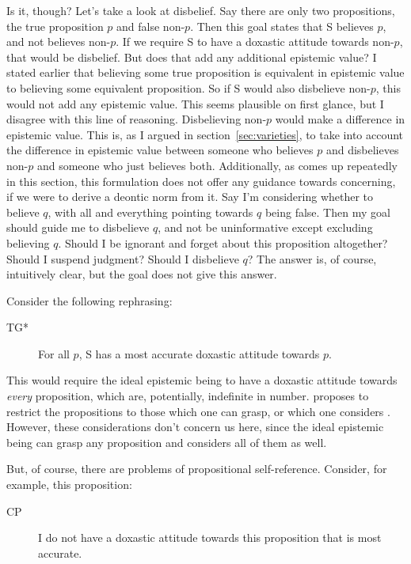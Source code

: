 \documentclass[12pt,numbers=noenddot]{scrartcl}
\begin{document}
Is it, though? Let's take a look at disbelief. Say there are only two propositions, the true proposition $p$ and false non-$p$. Then this goal states that S believes $p$, and not believes non-$p$. If we require S to have a doxastic attitude towards non-$p$, that would be disbelief. But does that add any additional epistemic value? I stated earlier that believing some true proposition is equivalent in epistemic value to believing some equivalent proposition. So if S would also disbelieve non-$p$, this would not add any epistemic value. This seems plausible on first glance, but I disagree with this line of reasoning. Disbelieving non-$p$ would make a difference in epistemic value. This is, as I argued in section \ref{sec:varieties}, to take into account the difference in epistemic value between someone who believes $p$ and disbelieves non-$p$ and someone who just believes both. Additionally, as comes up repeatedly in this section, this formulation does not offer any guidance towards concerning, if we were to derive a deontic norm from it. Say I'm considering whether to believe $q$, with all and everything pointing towards $q$ being false. Then my goal should guide me to disbelieve $q$, and not be uninformative except excluding believing $q$. Should I be ignorant and forget about this proposition altogether? Should I suspend judgment? Should I disbelieve $q$? The answer is, of course, intuitively clear, but the goal does not give this answer. 

Consider the following rephrasing:

\begin{description}
    \item[TG*] For all $p$, S has a most accurate doxastic attitude towards $p$.
\end{description}

This would require the ideal epistemic being to have a doxastic attitude towards \emph{every} proposition, which are, potentially, indefinite in number. \textcite[159]{David2001-DAVTAT-7} proposes to restrict the propositions to those which one can grasp, or which one considers \autocite[17]{Chisholm1966-CHITOK}. However, these considerations don't concern us here, since the ideal epistemic being can grasp any proposition and considers all of them as well.

But, of course, there are problems of propositional self-reference. Consider, for example, this proposition:
\begin{description}
    \item[CP] I do not have a doxastic attitude towards this proposition that is most accurate.
\end{description}
\end{document}
